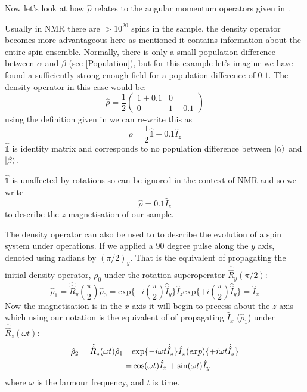 Now let's look at how $\hat\rho$ relates to the angular momentum operators given in .

Usually in NMR there are $>10^{20}$ spins in the sample, the density operator becomes more advantageous here
as mentioned it contains information about the entire spin ensemble. Normally, there is only a small population difference between $\alpha$ and $\beta$ (see \ref{Population}),
but for this example let's imagine we have found a sufficiently strong enough field for a population difference of $0.1$. The density operator in this case would be:
\begin{equation}
  \hat\rho = \frac{1}{2}\begin{pmatrix}
    1 + 0.1 & 0\\
    0 & 1-0.1
\end{pmatrix}
\end{equation}
using the definition given in  we can re-write this as
\begin{equation}
  \hat\rho = \frac{1}{2}\hat{\mathbb{1}} + 0.1\hat{I}_z
\end{equation}
$\hat{\mathbb{1}}$ is identity matrix and corresponds to no population difference between $\ket{\alpha}$ and $\ket{\beta}$.

$\hat{\mathbb{1}}$ is unaffected by rotations so can be ignored in the context of NMR
and so we write
\begin{equation}
  \hat{\rho} = 0.1\hat{I}_z
\end{equation}
to describe the $z$ magnetisation of our sample.

The density operator can also be used to to describe the evolution of a spin system under operations. If we applied a $90$ degree pulse along the $y$ axis, denoted using radians by $(\pi/2)_y$. That is the equivalent of propagating the initial density operator, $\rho_0$
under the rotation superoperator $\hat{\hat{R}}_y(\pi/2)$:
\begin{equation}
  \hat{\rho}_1 = \hat{\hat{R}}_y(\frac{\pi}{2})\hat\rho_0 = \text{exp}\{-i(\frac{\pi}{2})\hat{\hat{I}}_y\}\hat{I}_z\text{exp}\{+i(\frac{\pi}{2})\hat{\hat{I}}_y\} = \hat{I}_x
\end{equation}
Now the magnetisation is in the $x$-axis it will begin to precess about the $z$-axis which using our notation is the equivalent of of propagating $\hat{I}_x$ ($\hat{\rho}_1$)
under $\hat{\hat{R}}_z(\omega t)$:
\begin{align}\label{eqn:propagate}
  \hat{\rho}_2 = \hat{\hat{R}}_z(\omega t)\hat{\rho}_1 =& \text{exp}\{-i\omega t\hat{\hat{I}}_z\}\hat{I}_x\text(exp)\{+i\omega t\hat{\hat{I}}_z\}\\
   =& \cos(\omega t)\hat{I}_x + \sin(\omega t)\hat{I}_y
\end{align}
where $\omega$ is the larmour frequency, and $t$ is time.


